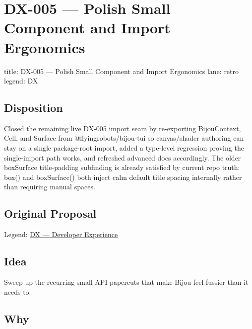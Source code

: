\chapter{DX-005 --- Polish Small Component and Import Ergonomics}\label{record-337}

\smallskip

\begin{RecordMeta}
title: DX-005 — Polish Small Component and Import Ergonomics
lane: retro
legend: DX

\end{RecordMeta}

\section{Disposition}\label{record-337-disposition}

Closed the remaining live DX-005 import seam by re-exporting BijouContext, Cell, and Surface from @flyingrobots/bijou-tui so canvas/shader authoring can stay on a single package-root import, added a type-level regression proving the single-import path works, and refreshed advanced docs accordingly. The older boxSurface title-padding subfinding is already satisfied by current repo truth: box() and boxSurface() both inject calm default title spacing internally rather than requiring manual spaces.

\section{Original Proposal}\label{record-337-original-proposal}

Legend: \href{https://github.com/flyingrobots/bijou/blob/1853ad902f6bf219326409e7f743a5a1d6517dbc/docs/method/legends/DX-developer-experience.md}{DX --- Developer Experience}

\section{Idea}\label{record-337-idea}

Sweep up the recurring small API papercuts that make Bijou feel fussier than it needs to.

\section{Why}\label{record-337-why}

